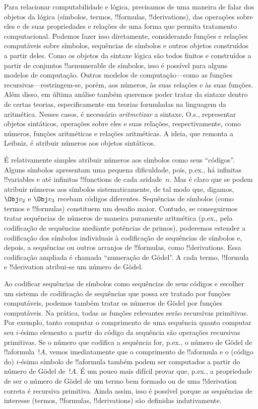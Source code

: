 \documentclass[../../../include/open-logic-section]{subfiles}
\begin{document}

Para relacionar computabilidade e lógica, precisamos de uma maneira de
falar dos objetos da lógica (símbolos, termos, !!{formula}s,
!!{derivation}s), das operações sobre eles e de suas propriedades e
relações de uma forma que permita tratamento computacional. Podemos
fazer isso diretamente, considerando funções e relações computáveis
sobre símbolos, sequências de símbolos e outros objetos construídos a
partir deles. Como os objetos da sintaxe lógica são todos finitos e
construídos a partir de conjuntos !!a{enumerable} de símbolos, isso é
possível para alguns modelos de computação. Outros modelos de
computação---como as funções recursivas---restringem-se, porém, aos
números, às suas relações e às suas funções. Além disso, em última
análise também queremos poder tratar da sintaxe dentro de certas
teorias, especificamente em teorias formuladas na linguagem da
aritmética. Nesses casos, é necessário \emph{aritmetizar} a sintaxe,
O.s.\@, representar objetos sintáticos, operações sobre eles e suas
relações, respectivamente, como números, funções aritméticas e relações
aritméticas. A ideia, que remonta a Leibniz, é atribuir números aos
objetos sintáticos.

É relativamente simples atribuir números aos símbolos como seus
``códigos''. Alguns símbolos apresentam uma pequena dificuldade, pois,
p.ex., há infinitas !!{variable}s e até infinitas !!{function}s
de cada aridade~$n$. Mas é claro que se podem atribuir números aos
símbolos sistematicamente, de tal modo que, digamos, $\Obj v_2$ e
$\Obj v_3$ recebam códigos diferentes. Sequências de símbolos (como
termos e !!{formula}s) constituem um desafio maior. Contudo, se
conseguirmos tratar sequências de números de maneira puramente
aritmética (p.ex., pela codificação de sequências mediante
potências de primos), poderemos estender a codificação dos símbolos
individuais à codificação de sequências de símbolos e, depois, a
sequências ou outros arranjos de !!{formula}s, como !!{derivation}s.
Essa codificação ampliada é chamada ``numeração de G\"odel''. A cada
termo, !!{formula} e !!{derivation} atribui-se um número de G\"odel.

Ao codificar sequências de símbolos como sequências de seus códigos e
escolher um sistema de codificação de sequências que possa ser tratado
por funções computáveis, podemos também tratar os números de G\"odel
por funções computáveis. Na prática, todas as funções relevantes serão
recursivas primitivas. Por exemplo, tanto computar o comprimento de uma
sequência quanto computar seu $i$-ésimo elemento a partir do código da
sequência são operações recursivas primitivas. Se o número que codifica
a sequência for, p.ex., o número de G\"odel de !!a{formula}~$!A$,
vemos imediatamente que o comprimento de !!a{formula} e o (código do)
$i$-ésimo símbolo de !!a{formula} também podem ser computados a partir
do número de G\"odel de~$!A$. É um pouco mais difícil provar que, p.ex., a propriedade de ser o número de G\"odel de um termo bem
formado ou de uma !!{derivation} correta é recursiva primitiva. Ainda
assim, isso é possível porque as sequências de interesse (termos,
!!{formula}s, !!{derivation}s) são definidas indutivamente.
\end{document}
